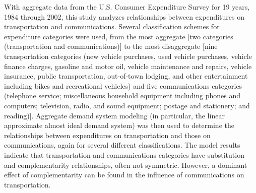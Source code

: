 With aggregate data from the U.S. Consumer Expenditure Survey for 19 years, 1984 through 2002, this study analyzes relationships between expenditures on transportation and communications. Several classification schemes for expenditure categories were used, from the most aggregate [two categories (transportation and communications)] to the most disaggregate [nine transportation categories (new vehicle purchases, used vehicle purchases, vehicle finance charges, gasoline and motor oil, vehicle maintenance and repairs, vehicle insurance, public transportation, out-of-town lodging, and other entertainment including bikes and recreational vehicles) and five communications categories (telephone service; miscellaneous household equipment including phones and computers; television, radio, and sound equipment; postage and stationery; and reading)]. Aggregate demand system modeling (in particular, the linear approximate almost ideal demand system) was then used to determine the relationships between expenditures on transportation and those on communications, again for several different classifications. The model results indicate that transportation and communications categories have substitution and complementarity relationships, often not symmetric. However, a dominant effect of complementarity can be found in the influence of communications on transportation.